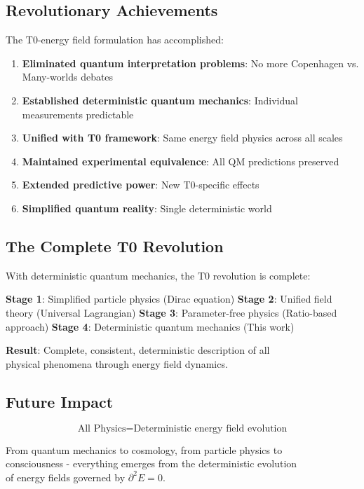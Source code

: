 \documentclass[12pt,a4paper]{article}
\newcommand{\Efield}{E}
\begin{document}
	\subsection{Revolutionary Achievements}
	
	The T0-energy field formulation has accomplished:
	
	\begin{enumerate}
		\item \textbf{Eliminated quantum interpretation problems}: No more Copenhagen vs. Many-worlds debates
		\item \textbf{Established deterministic quantum mechanics}: Individual measurements predictable
		\item \textbf{Unified with T0 framework}: Same energy field physics across all scales
		\item \textbf{Maintained experimental equivalence}: All QM predictions preserved
		\item \textbf{Extended predictive power}: New T0-specific effects
		\item \textbf{Simplified quantum reality}: Single deterministic world
	\end{enumerate}
	
	\subsection{The Complete T0 Revolution}
	
	With deterministic quantum mechanics, the T0 revolution is complete:
	
	\textbf{Stage 1}: Simplified particle physics (Dirac equation)
	\textbf{Stage 2}: Unified field theory (Universal Lagrangian)  
	\textbf{Stage 3}: Parameter-free physics (Ratio-based approach)
	\textbf{Stage 4}: Deterministic quantum mechanics (This work)
	
	\textbf{Result}: Complete, consistent, deterministic description of all \\
	physical phenomena through energy field dynamics.
	
	\subsection{Future Impact}
	
	\begin{equation}
		\boxed{\text{All Physics} = \text{Deterministic energy field evolution}}
	\end{equation}
	
	From quantum mechanics to cosmology, from particle physics to \\
	consciousness - everything emerges from the deterministic evolution \\
	of energy fields governed by $\partial^2 \Efield = 0$.
	
\end{document}
